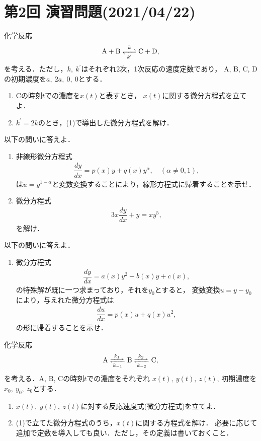 \section*{第2回 演習問題(2021/04/22)}
%
\enshu
化学反応
\begin{align*}
  \ce{A + B <=>[k][k^{\prime}] C + D}, 
\end{align*}
を考える．ただし，$k,~k^{\prime}$はそれぞれ2次，1次反応の速度定数であり，
A, B, C, Dの初期濃度を$a,~2a,~0,~0$とする．
\begin{enumerate}[(1)]
  \item Cの時刻$t$での濃度を$x(t)$と表すとき，
	$x(t)$に関する微分方程式を立てよ．
  \item $k^\prime = 2k$のとき，(1)で導出した微分方程式を解け． 
\end{enumerate}
%
\enshu
以下の問いに答えよ．
\begin{enumerate}[(1)]
  \item 非線形微分方程式
	\begin{align*}
	   \dfrac{dy}{dx} = p(x)y + q(x)y^{\alpha},\quad (\alpha \neq 0, 1),
	\end{align*}
	は$u=y^{1-\alpha}$と変数変換することにより，線形方程式に帰着することを示せ．
  \item 微分方程式
	\begin{align*}
	  3x\dfrac{dy}{dx} + y = xy^5, 
	\end{align*}
	を解け．
\end{enumerate}
%
\enshu
以下の問いに答えよ．
\begin{enumerate}[(1)]
  \item 微分方程式
	\begin{align*}
	  \dfrac{dy}{dx} = a(x)y^2 + b(x)y + c(x), 
	\end{align*}
	の特殊解が既に一つ求まっており，それを$y_0$とすると，
	変数変換$u = y - y_0$により，与えれた微分方程式は
	\begin{align*}
	  \dfrac{du}{dx} = p(x)u + q(x)u^{2}, 
	\end{align*}
	の形に帰着することを示せ．
\end{enumerate}
%
\enshu
化学反応
\begin{align*}
 \ce{A  <=>[k_1][k_{-1}] B <=>[k_2][k_{-2}] C}, 
\end{align*}
を考える．A, B, Cの時刻$t$での濃度をそれぞれ
$x\left(t\right),~y\left(t\right),~z\left(t\right)$,
初期濃度を$x_0,~y_0,~z_0$とする．
\begin{enumerate}[(1)]
  \item $x(t),~y(t),~z(t)$に対する反応速度式(微分方程式)を立てよ．
  \item (1)で立てた微分方程式のうち，$x(t)$に関する方程式を解け．
	必要に応じて追加で定数を導入しても良い．ただし，その定義は書いておくこと．
\end{enumerate}

